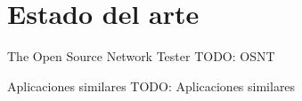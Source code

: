 \section{Estado del arte}

\begin{frame}{The Open Source Network Tester}
  TODO: OSNT
\end{frame}

\begin{frame}{Aplicaciones similares}
  TODO: Aplicaciones similares
\end{frame}
